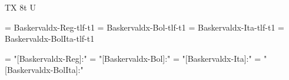 
\ifx\ffdecl\undefined  \fi

\ffdecl [Baskervald X] {\caps} {\rm \bf \it \bi} {} {TX} {8t U}


\ismacro{}\ifttrue

   \font\tenrm = Baskervaldx-Reg-tlf-t1  \sizespec
   \font\tenbf = Baskervaldx-Bol-tlf-t1  \sizespec
   \font\tenit = Baskervaldx-Ita-tlf-t1  \sizespec
   \font\tenbi = Baskervaldx-BolIta-tlf-t1 \sizespec

   \def\ffnamegen{Baskervaldx-\ffvarV\capsV-t1}

   \def\caps{\ffsetV{caps}{-tosf-sc}\ffsetX}  
   \def\nocaps{\ffsetX}
   \nocaps\relax

\fi

\ismacro{}\iftrue

   \font\tenrm = "[Baskervaldx-Reg]:\fontfeatures"    \sizespec
   \font\tenbf = "[Baskervaldx-Bol]:\fontfeatures"       \sizespec
   \font\tenit = "[Baskervaldx-Ita]:\fontfeatures"     \sizespec
   \font\tenbi = "[Baskervaldx-BolIta]:\fontfeatures" \sizespec

   \def\ffnamegen{"[Baskervaldx-\ffvarV]:\capsV\fontfeatures"} 

   \def\caps{\ffsetV{caps}{+smcp;+onum;}\ffsetX}
   \def\nocaps{\ffsetX}
   \nocaps\relax

\fi
\tenrm %

\def\narrow{\cond\fam}

\ifx\loadmathfonts\relax \endinput \fi
\ifx\mathpreloaded X\else  \fi                     


